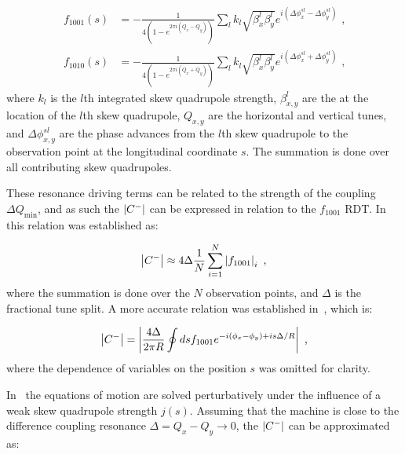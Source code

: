 \begin{equation}
    \begin{aligned}
        f_{1001}(s) &= - \frac{1}{4 \left(1 - e^{2 \pi i \left(Q_x - Q_y \right)}\right)} \sum_l k_l \sqrt{\beta_x^l \beta_y^l} e^{i \left(\Delta \phi_x^{s l} - \Delta \phi_y^{s l}\right)} \text{ ,} \\
        f_{1010}(s) &= - \frac{1}{4 \left(1 - e^{2 \pi i \left(Q_x + Q_y \right)}\right)} \sum_l k_l \sqrt{\beta_x^l \beta_y^l} e^{i \left(\Delta \phi_x^{s l} + \Delta \phi_y^{s l}\right)} \text{ ,}
    \end{aligned}
    \label{equation:coupling_rdts_from_skew_quads}
\end{equation}
where \(k_l\) is the \(l\)th integrated skew quadrupole strength, \(\beta_{x,y}^{l}\) are the \betafunctions at the location of the \(l\)th skew quadrupole, \(Q_{x,y}\) are the horizontal and vertical tunes, and \(\Delta \phi_{x,y}^{s l}\) are the phase advances from the \(l\)th skew quadrupole to the observation point at the longitudinal coordinate \(s\).
The summation is done over all contributing skew quadrupoles.

These resonance driving terms can be related to the strength of the coupling \(\Delta Q_{\mathrm{min}}\), and as such the \(\left\lvert C^{-} \right\rvert\) can be expressed in relation to the \(f_{1001}\) RDT.
In~\cite{PHD:Franchi} this relation was established as:

\begin{equation}
    \left\lvert C^{-} \right\rvert \approx 4 \Delta \frac{1}{N} \sum_{i=1}^N \left\lvert f_{1001} \right\rvert_i \text{ ,}
    \label{equation:deltaqmin_from_f1001_franchi}
\end{equation}
where the summation is done over the \(N\) observation points, and \(\Delta\) is the fractional tune split.
A more accurate relation was established in~\cite{PRAB:Persson:Improved_Control_Betatron_Coupling}, which is:

\begin{equation}
    \left\lvert C^{-} \right\rvert = \left\lvert \frac{4 \Delta}{2 \pi R} \oint d s f_{1001} e^{-i \left(\phi_x - \phi_y \right) + i s \Delta / R}  \right\rvert \text{ ,}
    \label{equation:deltaqmin_from_f1001}
\end{equation}
where the dependence of variables on the position \(s\) was omitted for clarity.

In~\cite{PHREV:Guignard:Betatron_Coupling_Radiation} the equations of motion are solved perturbatively under the influence of a weak skew quadrupole strength \(j(s)\).
Assuming that the machine is close to the difference coupling resonance \(\Delta = Q_x - Q_y \rightarrow 0\), the \(\left\lvert C^{-} \right\rvert\) can be approximated as:

